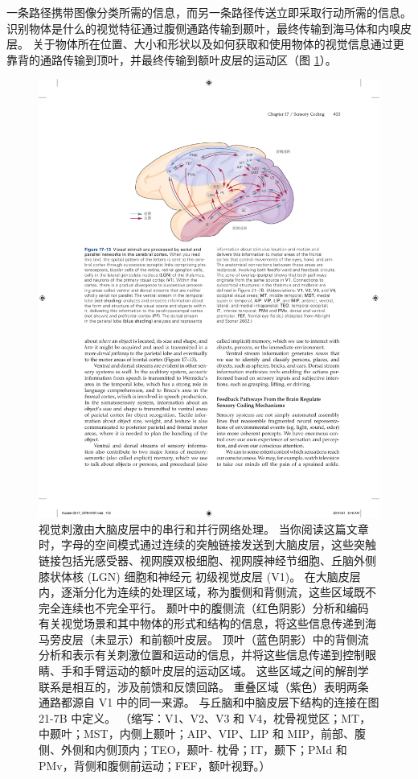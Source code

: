 一条路径携带图像分类所需的信息，而另一条路径传送立即采取行动所需的信息。 
识别物体是什么的视觉特征通过腹侧通路传输到颞叶，最终传输到海马体和内嗅皮层。 
关于物体所在位置、大小和形状以及如何获取和使用物体的视觉信息通过更靠背的通路传输到顶叶，并最终传输到额叶皮层的运动区（图 \ref{fig:17_13}）。


\begin{figure}[htbp]
	\centering
	\includegraphics[width=1.0\linewidth]{chap17/fig_17_13}
	\caption{视觉刺激由大脑皮层中的串行和并行网络处理。 
		当你阅读这篇文章时，字母的空间模式通过连续的突触链接发送到大脑皮层，这些突触链接包括光感受器、视网膜双极细胞、视网膜神经节细胞、丘脑外侧膝状体核 (LGN) 细胞和神经元 初级视觉皮层 (V1)。 
		在大脑皮层内，逐渐分化为连续的处理区域，称为腹侧和背侧流，这些区域既不完全连续也不完全平行。 
		颞叶中的腹侧流（红色阴影）分析和编码有关视觉场景和其中物体的形式和结构的信息，将这些信息传递到海马旁皮层（未显示）和前额叶皮层。 
		顶叶（蓝色阴影）中的背侧流分析和表示有关刺激位置和运动的信息，并将这些信息传递到控制眼睛、手和手臂运动的额叶皮层的运动区域。 
		这些区域之间的解剖学联系是相互的，涉及前馈和反馈回路。 
		重叠区域（紫色）表明两条通路都源自 V1 中的同一来源。 
		与丘脑和中脑皮层下结构的连接在图 21-7B 中定义。 （缩写：V1、V2、V3 和 V4，枕骨视觉区；MT，中颞叶；MST，内侧上颞叶；AIP、VIP、LIP 和 MIP，前部、腹侧、外侧和内侧顶内；TEO，颞叶- 枕骨；IT，颞下；PMd 和 PMv，背侧和腹侧前运动；FEF，额叶视野。）\cite{albright2002contextual}}
	\label{fig:17_13}
\end{figure}

